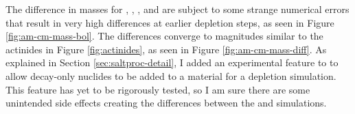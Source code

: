 The difference in masses for , , , and  are subject
to some strange numerical errors that result in very high differences at earlier depletion steps,
as seen in Figure \ref{fig:am-cm-mass-bol}. The differences converge to magnitudes similar to the
actinides in Figure \ref{fig:actinides}, as seen in Figure \ref{fig:am-cm-mass-diff}. As explained
in Section \ref{sec:saltproc-detail}, I added an experimental feature to \OpenMC to allow decay-only nuclides
to be added to a material for a depletion simulation. This feature has yet to be rigorously tested, so I am sure
there are some unintended side effects creating the differences between the \OpenMC and \SerpentTWO
simulations.

\begin{figure}[htpb]
    \centering
    \\
\end{figure}
